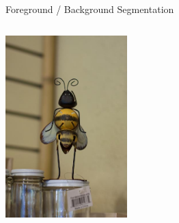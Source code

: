 \documentclass[mathserif]{beamer}
\begin{document}
\begin{frame}{Foreground / Background Segmentation}
\vspace{0.5em}
\begin{columns}[c]
\centering
\includegraphics[width=1.85in]{figures/bee.jpg}

\end{columns}
\end{frame}
\end{document}
